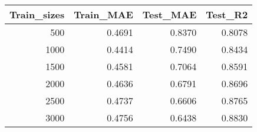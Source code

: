 \begin{tabular}{rrrr}
\toprule
Train_sizes & Train_MAE & Test_MAE & Test_R2 \\
\midrule
500 & 0.4691 & 0.8370 & 0.8078 \\
1000 & 0.4414 & 0.7490 & 0.8434 \\
1500 & 0.4581 & 0.7064 & 0.8591 \\
2000 & 0.4636 & 0.6791 & 0.8696 \\
2500 & 0.4737 & 0.6606 & 0.8765 \\
3000 & 0.4756 & 0.6438 & 0.8830 \\
\bottomrule
\end{tabular}

